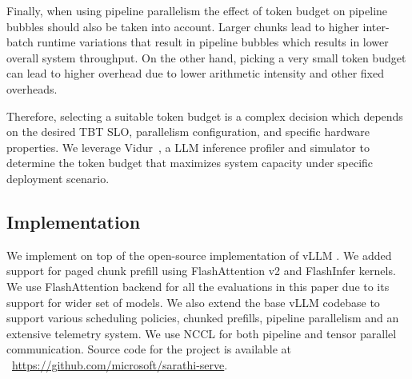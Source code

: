 Finally, when using pipeline parallelism the effect of token budget on pipeline bubbles should also be taken into account. Larger chunks lead to higher inter-batch runtime variations that result in pipeline bubbles which results in lower overall system throughput. On the other hand, picking a very small token budget can lead to higher overhead due to lower arithmetic intensity and other fixed overheads.

Therefore, selecting a suitable token budget is a complex decision which depends on the desired TBT SLO, parallelism configuration, and specific hardware properties. We leverage Vidur~\cite{vidur}, a LLM inference profiler and simulator to determine the token budget that maximizes system capacity under specific deployment scenario.



\subsection{Implementation} We implement \sysname on top of the open-source implementation of vLLM \cite{vllmsosp, vLLM:github}. %
We added support for paged chunk prefill using FlashAttention v2 \cite{flashattention2} and FlashInfer \cite{flashinfer} kernels. We use FlashAttention backend for all the evaluations in this paper due to its support for wider set of models. We also extend the base vLLM codebase to support various scheduling policies, chunked prefills, pipeline parallelism and an extensive telemetry system. We use NCCL \cite{nccl} for both pipeline and tensor parallel communication.
Source code for the project is available at ~\href{https://github.com/microsoft/sarathi-serve}{https://github.com/microsoft/sarathi-serve}. %


\begin{table}[tb!]
\centering
\setlength{\tabcolsep}{2pt}
\caption{Models and GPU configurations (GQA: grouped-query attention, SW: sliding window).}
\label{table:eval:models}
\end{table}
